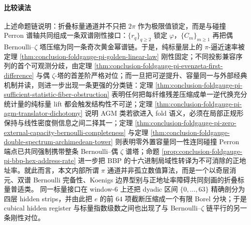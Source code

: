 \paragraph{比较读法}
上述命题链说明：折叠标量通道并不只把 \(2\pi\) 作为极限值锁定，而是与碰撞 Perron 谱轴共同组成一条双谱刚性接口：\(\{r_q\}_{q\ge 2}\) 锁定 \(\varphi\)，\(\{C_m\}_{m\ge 1}\) 再把偶 Bernoulli--\(\zeta\) 塔压缩为同一条奇次黄金幂谱链。于是，纯标量层上的 \(\pi\)-逼近速率被定理 \ref{thm:conclusion-foldgauge-pi-golden-linear-law} 刚性固定；不同投影兼容序列的首个可观测分歧，由定理 \ref{thm:conclusion-foldgauge-pi-evenzeta-first-difference} 与偶 \(\zeta\)-塔的首差阶严格对位；而一旦把可逆提升、容量同一与外部经典机制并读，则进一步出现一条更强的分类链：定理 \ref{thm:conclusion-foldgauge-pi-sufficient-statistic-fiber-obstruction} 表明任何把每纤维残差压缩成单一逆代换充分统计量的纯标量 lift 都会触发结构性不可逆；定理 \ref{thm:conclusion-foldgauge-pi-agm-translator-dichotomy} 说明 AGM 类若欲进入 fold 语义，必须在局部正规形保持与线性密度侧信息之间二择其一；定理 \ref{thm:conclusion-foldgauge-pi-zero-external-capacity-bernoulli-completeness} 与定理 \ref{thm:conclusion-foldgauge-double-spectrum-archimedean-tower} 则表明零外置容量同一性连同碰撞 Perron 端点已共同强制携带整条 Bernoulli--偶 \(\zeta\) 谱塔；命题 \ref{prop:conclusion-foldgauge-pi-bbp-hex-address-rate} 进一步把 BBP 的十六进制局域性转译为不可消除的正地址率。就此而言，本文内部所谓 \(\pi\) 通道并非孤立数值算法，而是一个以奇层消元、双谱 Bernoulli 完备性、Koenigs 边界型别与正地址率障碍共同刻画的折叠标量普适类。
同一标量接口在 window-\(6\) 上还把 dyadic 区间 \(\{0,\dots,63\}\) 精确剖分为四层 hidden strips，并由此把 \(e\) 的前 \(64\) 项截断压缩成一个有限 Borel 分块；于是 cubical hidden register 与标量指数级数之间也出现了与 Bernoulli--\(\zeta\) 链平行的另一条刚性对位。

\endinput
